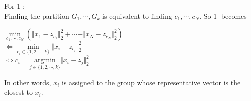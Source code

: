 \documentclass{article}
\begin{document}
\bigbreak

For \textcircled{1}: \\
Finding the partition $G_1, \cdots, G_k$ is equivalent to finding $c_1, \cdots, c_N$. So \textcircled{1} becomes
\begin{center}
    $\underset{c_1, \cdots, c_N}{\min}(\Vert x_1 - z_{c_1} \Vert_{2}^{2} + \cdots + \Vert x_N - z_{c_N} \Vert_{2}^{2})$ \\
    $\iff \underset{c_i \in \{1,2,\cdots,k\}}{\min} \Vert x_i - z_{c_i} \Vert_{2}^{2}$ \\
    $\iff c_i = \underset{j \in \{1, 2,\cdots, k\}}{\text{argmin}} \Vert x_i - z_j \Vert_{2}^{2}$
    
\end{center}

In other words, $x_i$ is assigned to the group whose representative vector is the closest to $x_i$.

\bigbreak
\end{document}
